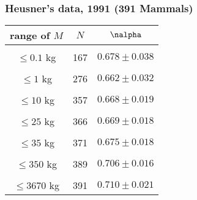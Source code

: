 \begin{frame}
  \frametitle{Heusner's data, 1991 (391 Mammals)}

  \begin{block}{}
  \begin{center}
    \settablerowcolours
     \begin{tabular}{c|c|c}
       range of $M$ & $N$ & $\nalpha$ \\ \hline
       & & \\
       $\leq 0.1$ kg    &  167          & $0.678 \pm 0.038$ \\
       & & \\
       $\leq 1$  kg     &  276          & $0.662 \pm 0.032$ \\
       & & \\
       $\leq 10$ kg     &  357          & $0.668 \pm 0.019$ \\
       & & \\
       $\leq 25$ kg     &  366          & $0.669 \pm 0.018$ \\
       & & \\
       $\leq 35$ kg     &  371          & $0.675 \pm 0.018$ \\
       & & \\
       $\leq 350$ kg    &  389          & $0.706 \pm 0.016$ \\
       & & \\
       $\leq 3670$ kg   &  391          & $0.710 \pm 0.021$ \\
     \end{tabular}
  \end{center}
  \end{block}

\end{frame}


